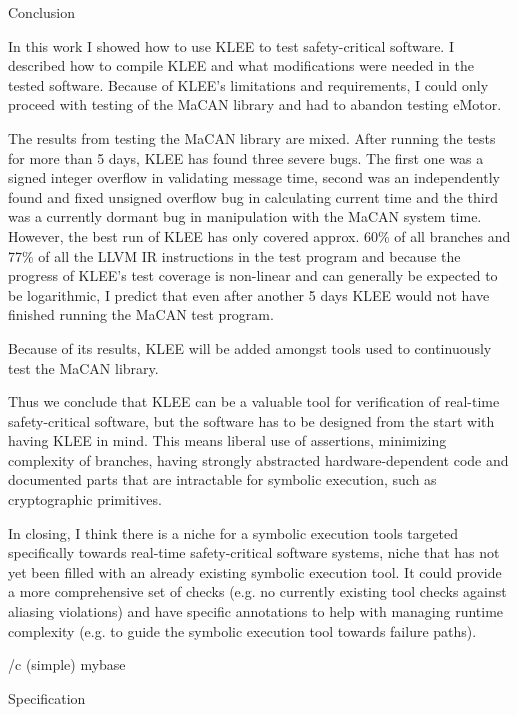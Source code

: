 \chap Conclusion

In this work I showed how to use KLEE to test safety-critical software. I
described how to compile KLEE and what modifications were needed in the tested
software. Because of KLEE's limitations and requirements, I could only proceed
with testing of the MaCAN library and had to abandon testing eMotor.

The results from testing the MaCAN library are mixed. After running the tests
for more than 5 days, KLEE has found three severe bugs. The first one was a
signed integer overflow in validating message time, second was an independently
found and fixed unsigned overflow bug in calculating current time and the third
was a currently dormant bug in manipulation with the MaCAN system time.
However, the best run of KLEE has only covered approx.
60\% of all branches and 77\% of all the LLVM IR instructions in the test
program and because the progress of KLEE's test coverage is non-linear and
can generally be expected to be logarithmic, I predict that even after another
5 days KLEE would not have finished running the MaCAN test program.

Because of its results, KLEE will be added amongst tools used to continuously
test the MaCAN library.

Thus we conclude that KLEE can be a valuable tool for verification of
real-time safety-critical software, but the software has to be designed from
the start with having KLEE in mind. This means liberal use of assertions,
minimizing complexity of branches, having strongly abstracted
hardware-dependent code and documented parts that are intractable for symbolic
execution, such as cryptographic primitives.

In closing, I think there is a niche for a symbolic execution tools targeted
specifically towards real-time safety-critical software systems, niche that has
not yet been filled with an already existing symbolic execution tool. It could
provide a more comprehensive set of checks (e.g. no currently existing tool
checks against aliasing violations) and have specific annotations to help with
managing runtime complexity (e.g. to guide the symbolic execution tool towards
failure paths).


\nextoddpage

\bibchap
\usebib/c (simple) mybase


\app Specification

